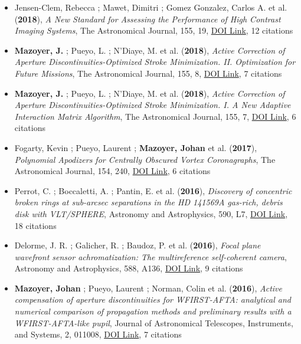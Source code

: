 \documentclass[11pt]{article}
\begin{document}
\begin{itemize}
\item Jensen-Clem, Rebecca ; Mawet, Dimitri ; Gomez Gonzalez, Carlos A. et al. ({\bf2018}), {\it A New Standard for Assessing the Performance of High Contrast Imaging Systems}, The Astronomical Journal, 155, 19, \href{https://doi.org/10.3847/1538-3881/aa97e4}{DOI Link}, 12 citations

\item {\bf Mazoyer, J.} ; Pueyo, L. ; N'Diaye, M. et al. ({\bf2018}), {\it Active Correction of Aperture Discontinuities-Optimized Stroke Minimization. II. Optimization for Future Missions}, The Astronomical Journal, 155, 8, \href{https://doi.org/10.3847/1538-3881/aa91d7}{DOI Link}, 7 citations

\item {\bf Mazoyer, J.} ; Pueyo, L. ; N'Diaye, M. et al. ({\bf2018}), {\it Active Correction of Aperture Discontinuities-Optimized Stroke Minimization. I. A New Adaptive Interaction Matrix Algorithm}, The Astronomical Journal, 155, 7, \href{https://doi.org/10.3847/1538-3881/aa91cf}{DOI Link}, 6 citations

\item Fogarty, Kevin ; Pueyo, Laurent ; {\bf Mazoyer, Johan} et al. ({\bf2017}), {\it Polynomial Apodizers for Centrally Obscured Vortex Coronagraphs}, The Astronomical Journal, 154, 240, \href{https://doi.org/10.3847/1538-3881/aa9063}{DOI Link}, 6 citations

\item Perrot, C. ; Boccaletti, A. ; Pantin, E. et al. ({\bf2016}), {\it Discovery of concentric broken rings at sub-arcsec separations in the HD 141569A gas-rich, debris disk with VLT/SPHERE}, Astronomy and Astrophysics, 590, L7, \href{https://doi.org/10.1051/0004-6361/201628396}{DOI Link}, 18 citations

\item Delorme, J. R. ; Galicher, R. ; Baudoz, P. et al. ({\bf2016}), {\it Focal plane wavefront sensor achromatization: The multireference self-coherent camera}, Astronomy and Astrophysics, 588, A136, \href{https://doi.org/10.1051/0004-6361/201527657}{DOI Link}, 9 citations

\item {\bf Mazoyer, Johan} ; Pueyo, Laurent ; Norman, Colin et al. ({\bf2016}), {\it Active compensation of aperture discontinuities for WFIRST-AFTA: analytical and numerical comparison of propagation methods and preliminary results with a WFIRST-AFTA-like pupil}, Journal of Astronomical Telescopes, Instruments, and Systems, 2, 011008, \href{https://doi.org/10.1117/1.JATIS.2.1.011008}{DOI Link}, 7 citations


\end{itemize}
\end{document}
